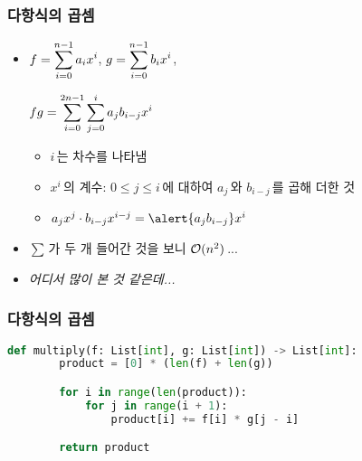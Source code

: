 \begin{frame}
    \frametitle{다항식의 곱셈}
    \begin{itemize}
        \setlength{\itemsep}{1em}
        \item<2-> \(\displaystyle f = \sum_{i = 0}^{n - 1} a_i x^i\), \(\displaystyle g = \sum_{i = 0}^{n - 1} b_i x^i\),
              \smallskip
              \begin{center}
                  \(\displaystyle fg = \sum_{i = 0}^{2n - 1} \sum_{j = 0}^{i} a_{j} b_{i - j} x^i\)
              \end{center}
              \begin{itemize}
                  \item<3-> \(i\)\,는 \alert{차수}를 나타냄
                        \medskip
                  \item<4-> \(x^i\)\,의 계수: \(0 \leq j \leq i\)\,에 대하여 \(a_j\)\,와 \(b_{i-j}\)\,를 곱해 더한 것
                        \medskip
                  \item<4-> \(a_j x^j \cdot b_{i - j} x^{i - j} = \alert{a_j b_{i-j}} x^{i}\)
              \end{itemize}
        \item<5-> \(\sum\)\,가 두 개 들어간 것을 보니 \(\mathcal{O}(n^2)\)\,...
        \item<6-> \textit{어디서 많이 본 것 같은데...}
    \end{itemize}
\end{frame}

\begin{frame}[fragile]
    \frametitle{다항식의 곱셈}
    \begin{center}
        \begin{lstlisting}[language=Python]
    def multiply(f: List[int], g: List[int]) -> List[int]:
        product = [0] * (len(f) + len(g))

        for i in range(len(product)):
            for j in range(i + 1):
                product[i] += f[i] * g[j - i]

        return product
\end{lstlisting}
    \end{center}
\end{frame}
